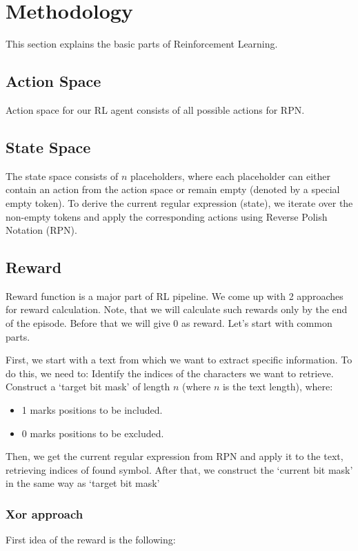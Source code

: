 \documentclass{article}
\begin{document}
\section{Methodology}
This section explains the basic parts of Reinforcement Learning.
\subsection{Action Space}
Action space for our RL agent consists of all possible actions for RPN.

\subsection{State Space}
The state space consists of $n$ placeholders, where each placeholder can either contain an action
from the action space or remain empty (denoted by a special empty token).
To derive the current regular expression (state), we iterate over the non-empty tokens and apply the corresponding
actions using Reverse Polish Notation (RPN).

\subsection{Reward}
Reward function is a major part of RL pipeline. We come up with 2 approaches for reward calculation.
Note, that we will calculate such rewards only by the end of the episode. Before that we will give 0 as reward.
Let's start with common parts.

First, we start with a text from which we want to extract specific information. To do this, we need to:
Identify the indices of the characters we want to retrieve.
Construct a `target bit mask' of length $n$ (where $n$ is the text length), where:
\begin{itemize}
  \item 1 marks positions to be included.
  \item 0 marks positions to be excluded.
\end{itemize}

Then, we get the current regular expression from RPN and apply it to the text, retrieving indices of found symbol.
After that, we construct the `current bit mask' in the same way as `target bit mask'

\subsubsection{Xor approach}
First idea of the reward is the following:
\end{document}
